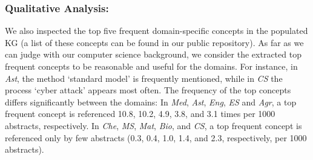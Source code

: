 \documentclass[runningheads]{llncs}
\begin{document}
\begin{comment}
Material & \begin{tabular}[c]{@{}l@{}}conser-\\ vation \\ status\end{tabular}    & black hole                                                            & \begin{tabular}[c]{@{}l@{}}PRIDE \\ repository\end{tabular}                        & \begin{tabular}[c]{@{}l@{}}interactive \\ environ-\\ ment\end{tabular} & \begin{tabular}[c]{@{}l@{}}spark \\ ignition \\ engine\end{tabular}         & volcano                                                                                  & \begin{tabular}[c]{@{}l@{}}near-wall \\ region\end{tabular}          & \begin{tabular}[c]{@{}l@{}}polycry-\\ stalline \\ sample\end{tabular}  & monoid                                                     & \begin{tabular}[c]{@{}l@{}}study \\ group\end{tabular}                      & model        \\
\end{tabular}
}
\end{table}
\end{comment}

\subsubsection{Qualitative Analysis:}
We also inspected the top five frequent domain-specific concepts in the populated KG (a list of these concepts can be found in our public repository). As far as we can judge with our computer science background, we consider the extracted top frequent concepts to be reasonable and useful for the domains. For instance, in \textit{Ast}, the method `standard model' is frequently mentioned, while in \textit{CS} the process `cyber attack' appears most often.
The frequency of the top concepts differs significantly between the domains: In \textit{Med}, \textit{Ast}, \textit{Eng}, \textit{ES} and \textit{Agr}, a top frequent concept is referenced 10.8, 10.2, 4.9, 3.8, and 3.1 times per 1000 abstracts, respectively. In \textit{Che}, \textit{MS}, \textit{Mat}, \textit{Bio}, and \textit{CS}, a top frequent concept is referenced only by few abstracts (0.3, 0.4, 1.0, 1.4, and 2.3, respectively, per 1000 abstracts).
\end{document}
